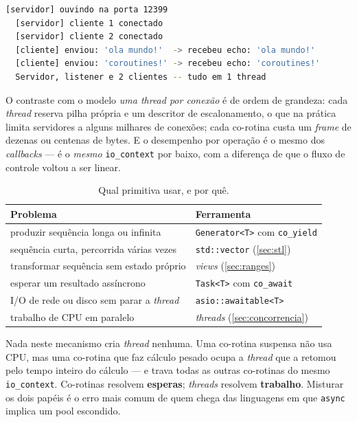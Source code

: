 \begin{lstlisting}[style=bt, language=bash,
    caption={Saída de \texttt{dist/bin/coroutines}, demo 4.2: servidor,
             \emph{listener} e dois clientes no mesmo \texttt{io\_context}.}]
  [servidor] ouvindo na porta 12399
  [servidor] cliente 1 conectado
  [servidor] cliente 2 conectado
  [cliente] enviou: 'ola mundo!'  -> recebeu echo: 'ola mundo!'
  [cliente] enviou: 'coroutines!' -> recebeu echo: 'coroutines!'
  Servidor, listener e 2 clientes -- tudo em 1 thread
\end{lstlisting}

O contraste com o modelo \emph{uma \emph{thread} por conexão} é de ordem de
grandeza: cada \emph{thread} reserva pilha própria e um descritor de
escalonamento, o que na prática limita servidores a alguns milhares de conexões;
cada co-rotina custa um \emph{frame} de dezenas ou centenas de bytes. E o
desempenho por operação é o mesmo dos \emph{callbacks} --- é o \emph{mesmo}
\texttt{io\_context} por baixo, com a diferença de que o fluxo de controle
voltou a ser linear.

\begin{table}[htbp]
\centering
\caption{Qual primitiva usar, e por quê.}
\label{tab:escolha-corotina}
\footnotesize
\begin{tabular}{@{}ll@{}}
\toprule
\textbf{Problema} & \textbf{Ferramenta} \\
\midrule
produzir sequência longa ou infinita        & \texttt{Generator<T>} com \texttt{co\_yield} \\
sequência curta, percorrida várias vezes    & \texttt{std::vector} (\cref{sec:stl}) \\
transformar sequência sem estado próprio    & \emph{views} (\cref{sec:ranges}) \\
esperar um resultado assíncrono             & \texttt{Task<T>} com \texttt{co\_await} \\
I/O de rede ou disco sem parar a \emph{thread} & \texttt{asio::awaitable<T>} \\
trabalho de CPU em paralelo                 & \emph{threads} (\cref{sec:concorrencia}) \\
\bottomrule
\end{tabular}
\end{table}

\begin{regra}
Nada neste mecanismo cria \emph{thread} nenhuma. Uma co-rotina suspensa não usa
CPU, mas uma co-rotina que faz cálculo pesado ocupa a \emph{thread} que a
retomou pelo tempo inteiro do cálculo --- e trava todas as outras co-rotinas do
mesmo \texttt{io\_context}. Co-rotinas resolvem \textbf{esperas}; \emph{threads}
resolvem \textbf{trabalho}. Misturar os dois papéis é o erro mais comum de quem
chega das linguagens em que \texttt{async} implica um pool escondido.
\end{regra}

